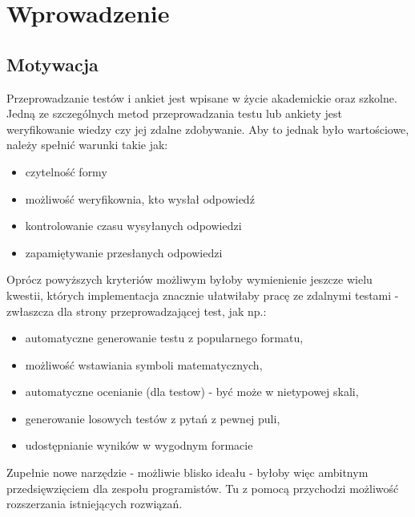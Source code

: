 \chapter{Wprowadzenie}%
\section{Motywacja}
Przeprowadzanie testów i ankiet jest wpisane w życie akademickie oraz szkolne. Jedną ze szczególnych metod przeprowadzania testu lub ankiety jest weryfikowanie wiedzy czy jej zdalne zdobywanie.
Aby to jednak było wartościowe, należy spełnić warunki takie jak:
\begin{itemize}
\item czytelność formy
\item możliwość weryfikownia, kto wysłał odpowiedź
\item kontrolowanie czasu wysyłanych odpowiedzi
\item zapamiętywanie przesłanych odpowiedzi
\end{itemize}
Oprócz powyższych kryteriów możliwym byłoby wymienienie jeszcze wielu kwestii, których implementacja znacznie ułatwiłaby pracę ze zdalnymi testami - zwłaszcza dla strony przeprowadzającej test, jak np.:
\begin{itemize}
\item automatyczne generowanie testu z popularnego formatu,
\item możliwość wstawiania symboli matematycznych,
\item automatyczne ocenianie (dla testow)  - być może w nietypowej skali,
\item generowanie losowych testów z pytań z pewnej puli,
\item udostępnianie wyników w wygodnym formacie
\end{itemize}
Zupełnie nowe narzędzie - możliwie blisko ideału - byłoby więc ambitnym przedsięwzięciem dla zespołu programistów. Tu z pomocą przychodzi możliwość rozszerzania istniejących rozwiązań.

